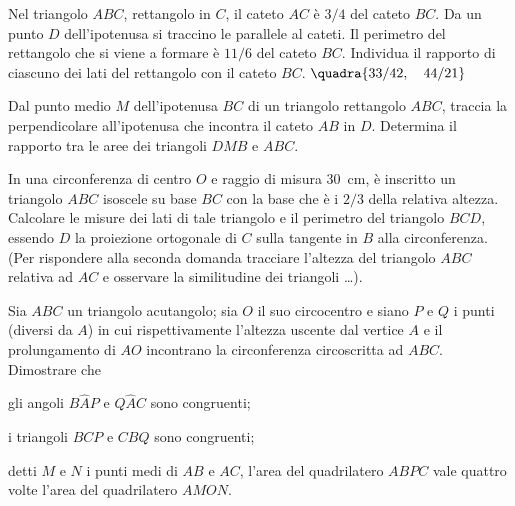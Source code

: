 \begin{multicols}{2}

\begin{esercizio}
\label{ese:6.93}
Nel triangolo $ABC$, rettangolo in $C$, il cateto $AC$ è $3/4$ del 
cateto $BC$. Da un punto $D$ dell'ipotenusa si traccino le parallele 
al cateti. Il perimetro del rettangolo che si viene a formare è 
$11/6$ del cateto $BC$. Individua il rapporto di ciascuno dei lati 
del rettangolo con il cateto $BC$.
\hfill$\quadra{33/42,\quad 44/21}$
\end{esercizio}

\begin{esercizio}
\label{ese:6.94}
Dal punto medio $M$ dell'ipotenusa $BC$ di un triangolo rettangolo 
$ABC$, traccia la perpendicolare all'ipotenusa che incontra il cateto 
$AB$ in $D$. Determina il rapporto tra le aree dei triangoli $DMB$ e 
$ABC$.
\end{esercizio}

\begin{esercizio}
\label{ese:6.95}
In una circonferenza di centro $O$ e raggio di misura 30~cm, è 
inscritto un triangolo $ABC$ isoscele su base $BC$ con la base che è 
i $2/3$ della relativa altezza. Calcolare le misure dei lati di tale 
triangolo e il perimetro del triangolo $BCD$, essendo $D$ la 
proiezione ortogonale di $C$ sulla tangente in $B$ alla 
circonferenza. (Per rispondere alla seconda domanda tracciare 
l'altezza del triangolo $ABC$ relativa ad $AC$ e osservare la 
similitudine dei triangoli \ldots{}).
\end{esercizio}

\end{multicols}

\begin{esercizio}
\label{ese:6.96}
Sia $ABC$ un triangolo acutangolo; sia $O$ il suo circocentro e siano 
$P$ e $Q$ i punti (diversi da $A$) in cui rispettivamente l'altezza 
uscente dal vertice $A$ e il prolungamento di $AO$ incontrano la 
circonferenza circoscritta ad $ABC$. Dimostrare che
\begin{enumeratea}
\item gli angoli $B\widehat{A}P$ e $Q\widehat{A}C$ sono congruenti;
\item i triangoli $BCP$ e $CBQ$ sono congruenti;
\item detti $M$ e $N$ i punti medi di $AB$ e $AC$, l'area del 
quadrilatero $ABPC$ vale quattro volte l'area del quadrilatero $AMON$.
\end{enumeratea}
\end{esercizio}


